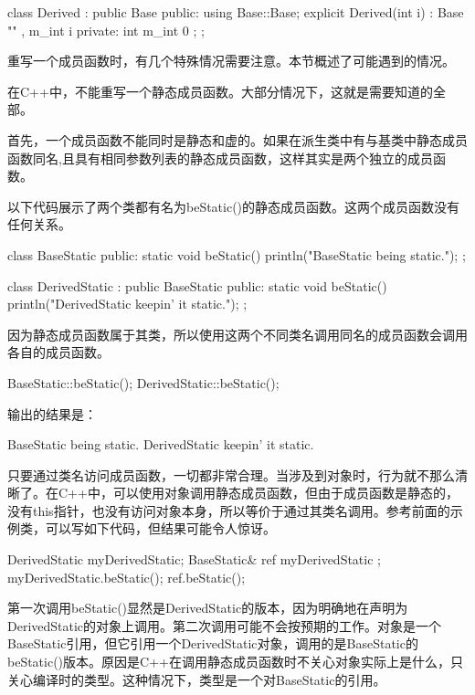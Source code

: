 \begin{cpp}
class Derived : public Base
{
    public:
        using Base::Base;
        explicit Derived(int i) : Base { "" }, m_int { i } {}
    private:
        int m_int { 0 };
};
\end{cpp}


重写一个成员函数时，有几个特殊情况需要注意。本节概述了可能遇到的情况。


在C++中，不能重写一个静态成员函数。大部分情况下，这就是需要知道的全部。

首先，一个成员函数不能同时是静态和虚的。如果在派生类中有与基类中静态成员函数同名,且具有相同参数列表的静态成员函数，这样其实是两个独立的成员函数。

以下代码展示了两个类都有名为beStatic()的静态成员函数。这两个成员函数没有任何关系。

\begin{cpp}
class BaseStatic
{
    public:
    static void beStatic() { println("BaseStatic being static."); }
};

class DerivedStatic : public BaseStatic
{
    public:
    static void beStatic() { println("DerivedStatic keepin' it static."); }
};
\end{cpp}

因为静态成员函数属于其类，所以使用这两个不同类名调用同名的成员函数会调用各自的成员函数。

\begin{cpp}
BaseStatic::beStatic();
DerivedStatic::beStatic();
\end{cpp}

输出的结果是：

\begin{shell}
BaseStatic being static.
DerivedStatic keepin' it static.
\end{shell}

只要通过类名访问成员函数，一切都非常合理。当涉及到对象时，行为就不那么清晰了。在C++中，可以使用对象调用静态成员函数，但由于成员函数是静态的，没有this指针，也没有访问对象本身，所以等价于通过其类名调用。参考前面的示例类，可以写如下代码，但结果可能令人惊讶。

\begin{cpp}
DerivedStatic myDerivedStatic;
BaseStatic& ref { myDerivedStatic };
myDerivedStatic.beStatic();
ref.beStatic();
\end{cpp}

第一次调用beStatic()显然是DerivedStatic的版本，因为明确地在声明为DerivedStatic的对象上调用。第二次调用可能不会按预期的工作。对象是一个BaseStatic引用，但它引用一个DerivedStatic对象，调用的是BaseStatic的beStatic()版本。原因是C++在调用静态成员函数时不关心对象实际上是什么，只关心编译时的类型。这种情况下，类型是一个对BaseStatic的引用。

